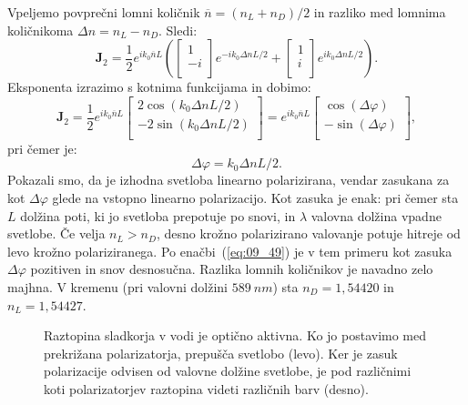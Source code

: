 Vpeljemo povprečni lomni količnik $\overline{n} = (n_L + n_D)/2$ in razliko
med lomnima količnikoma $\Delta n = n_L-n_D$. Sledi:
\begin{equation}
\mathbf{J}_{2}  = \frac{1}{2} e^{ik_0\overline{n} L}
\left(
\left[\begin{array}{c}
1\\
-i\\
\end{array}\right]e^{-ik_0 \Delta n L/2}+
\left[\begin{array}{c}
1\\
i\\
\end{array}\right]e^{ik_0\Delta n L/2}
\right)\!\!.
\label{eq:09_46}
\end{equation}
Eksponenta izrazimo s kotnima funkcijama in dobimo:
\begin{equation}
\mathbf{J}_{2}  = \frac{1}{2} e^{ik_0\overline{n} L}
\left[\begin{array}{c}
2 \cos(k_0 \Delta n L/2)\\
-2 \sin(k_0 \Delta n L/2)\\
\end{array}\right] = 
e^{ik_0\overline{n} L}
\left[\begin{array}{c}
\cos(\Delta \varphi)\\
-\sin(\Delta \varphi)\\
\end{array}\right]\!\!,
\label{eq:09_47}
\end{equation}
pri čemer je:
\begin{equation}
\Delta \varphi = k_0 \Delta n L/2.
\label{eq:09_48}
\end{equation}
Pokazali smo, da je izhodna svetloba linearno polarizirana, vendar zasukana za kot 
$\Delta \varphi$ glede na vstopno linearno polarizacijo. Kot zasuka je enak:
pri čemer sta $L$ dolžina poti, ki jo svetloba prepotuje po snovi, in $\lambda$ valovna
dolžina vpadne svetlobe. 
Če velja $n_L>n_D$, desno krožno polarizirano valovanje potuje
hitreje od levo krožno polariziranega. Po enačbi~(\ref{eq:09_49}) je v tem primeru kot 
zasuka $\Delta \varphi$ pozitiven in snov desnosučna. 
Razlika lomnih količnikov je navadno zelo majhna. V kremenu (pri 
valovni dolžini $589~\si{nm}$) sta $n_D = 1,54420$ in $n_L = 1,54427$.
\begin{figure}[ht]
\centering
\def\svgwidth{140truemm} 

\caption{Raztopina sladkorja v vodi je optično aktivna. Ko jo postavimo med prekrižana
polarizatorja, prepušča svetlobo (levo). Ker je zasuk polarizacije odvisen od valovne dolžine
svetlobe, je pod različnimi koti polarizatorjev raztopina videti različnih barv (desno).}
\label{fig:09_aktivnost-foto}
\end{figure}

